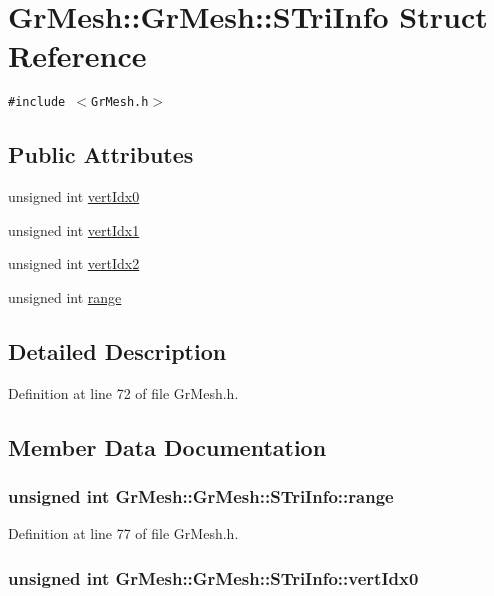 \hypertarget{struct_gr_mesh_1_1_s_tri_info}{
\section{GrMesh::GrMesh::STriInfo Struct Reference}
\label{struct_gr_mesh_1_1_s_tri_info}
}
{\tt \#include $<$GrMesh.h$>$}

\subsection*{Public Attributes}
\begin{CompactItemize}
\item 
unsigned int \hyperlink{struct_gr_mesh_1_1_s_tri_info_9bc04351aef8330fc78affacb8e996b8}{vertIdx0}
\item 
unsigned int \hyperlink{struct_gr_mesh_1_1_s_tri_info_f5c9d056b0352c52ff90d8e93c5c2a8d}{vertIdx1}
\item 
unsigned int \hyperlink{struct_gr_mesh_1_1_s_tri_info_34bdea9839ffbe456dee3b49b1c95843}{vertIdx2}
\item 
unsigned int \hyperlink{struct_gr_mesh_1_1_s_tri_info_c78784ea7bad63b92d4bd7ae1e11f429}{range}
\end{CompactItemize}


\subsection{Detailed Description}


Definition at line 72 of file GrMesh.h.

\subsection{Member Data Documentation}
\hypertarget{struct_gr_mesh_1_1_s_tri_info_c78784ea7bad63b92d4bd7ae1e11f429}{
\subsubsection[{range}]{\setlength{\rightskip}{0pt plus 5cm}unsigned int {\bf GrMesh::GrMesh::STriInfo::range}}}
\label{struct_gr_mesh_1_1_s_tri_info_c78784ea7bad63b92d4bd7ae1e11f429}




Definition at line 77 of file GrMesh.h.\hypertarget{struct_gr_mesh_1_1_s_tri_info_9bc04351aef8330fc78affacb8e996b8}{
\subsubsection[{vertIdx0}]{\setlength{\rightskip}{0pt plus 5cm}unsigned int GrMesh::GrMesh::STriInfo::vertIdx0}}
\label{struct_gr_mesh_1_1_s_tri_info_9bc04351aef8330fc78affacb8e996b8}




